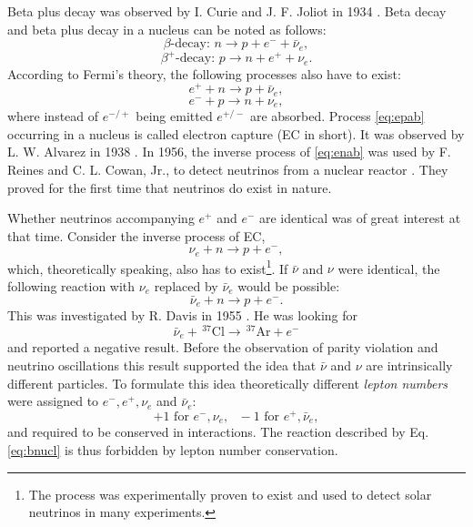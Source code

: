 Beta plus decay was observed by I. Curie and J. F. Joliot in 1934
\cite{Cur34}. Beta decay and beta plus decay in a nucleus can be noted
as follows:
\begin{equation}
  \label{eq:bd}
  \beta\mbox{-decay: } n \rightarrow p+e^{-}+\bar{\nu}_e ,
\end{equation}
\begin{equation}
  \label{eq:bpd}
  \beta^+\mbox{-decay: } p \rightarrow n+e^{+}+\nu_e .
\end{equation}
According to Fermi's theory, the following processes also have to
exist:
\begin{equation}
  \label{eq:enab}
  e^{+} + n \rightarrow p + \bar{\nu}_e ,
\end{equation}
\begin{equation}
  \label{eq:epab}
  e^{-} + p \rightarrow n + \nu_e ,
\end{equation}
where instead of $e^{-/+}$ being emitted $e^{+/-}$ are
absorbed. Process \ref{eq:epab} occurring in a nucleus is called
electron capture (EC in short). It was observed by L. W. Alvarez in
1938 \cite{Alv38}. In 1956, the inverse process of \ref{eq:enab} was
used by F. Reines and C. L. Cowan, Jr., to detect neutrinos from a
nuclear reactor \cite{Cow56, Rei56}. They proved for the first time
that neutrinos do exist in nature.

Whether neutrinos accompanying $e^{+}$ and $e^{-}$ are identical was
of great interest at that time. Consider the inverse process of EC,
\begin{equation}
  \label{eq:nunab}
  \nu_e + n \rightarrow p + e^{-} ,
\end{equation}
which, theoretically speaking, also has to exist\footnote{The process
was experimentally proven to exist and used to detect solar neutrinos
in many experiments.}. If $\bar{\nu}$ and $\nu$ were identical, the
following reaction with $\nu_e$ replaced by $\bar{\nu}_{e}$ would be
possible:
\begin{equation}
  \label{eq:bnun}
  \bar{\nu}_e + n \rightarrow p + e^{-}.
\end{equation}
This was investigated by R. Davis in 1955 \cite{Dav55, Dav56}. He was
looking for
\begin{equation}
  \label{eq:bnucl}
  \bar{\nu}_e + \, ^{37} \! \text{Cl} \rightarrow \, ^{37} \! \text{Ar} + e^{-}
\end{equation}
and reported a negative result. Before the observation of parity
violation and neutrino oscillations this result supported the idea
that $\bar{\nu}$ and $\nu$ are intrinsically different particles. To
formulate this idea theoretically different \emph{lepton numbers} were
assigned to $e^{-}, e^{+}, \nu_e$ and $\bar{\nu}_e$:
\begin{equation}
\label{eq:ln}
+1 \mbox{ for }e^{-}, \nu_e, \mbox{   }-1 \mbox{ for  }e^{+},\bar{\nu}_e,
\end{equation}
and required to be conserved in interactions. The reaction described
by Eq. \ref{eq:bnucl} is thus forbidden by lepton number conservation.

